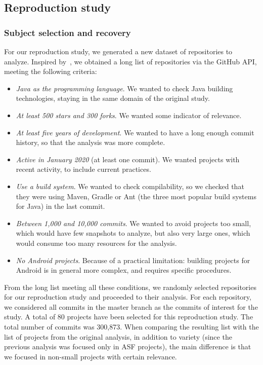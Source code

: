 \subsection{Reproduction study}

\subsubsection{Subject selection and recovery}

For our reproduction study, we generated a new dataset of repositories to analyze. Inspired by~\cite{Sulir:2016:QSJ:3001878.3001882}, we obtained a long list of repositories via the GitHub API, meeting the following criteria:

\begin{itemize}
\item \textit{Java as the programming language}. We wanted to check Java building technologies, staying in the same domain of the original study.
\item \textit{At least 500 stars and 300 forks}. We wanted some indicator of relevance.
\item \textit{At least five years of development}. We wanted to have a long enough commit history, so that the analysis was more complete.
\item \textit{Active in January 2020} (at least one commit). We wanted projects with recent activity, to include current practices.
\item \textit{Use a build system}. We wanted to check compilability, so we checked that they were using Maven, Gradle or Ant (the three most popular build systems for Java) in the last commit.
\item \textit{Between 1,000 and 10,000 commits}. We wanted to avoid projects too small, which would have few snapshots to analyze, but also very large ones, which would consume too many resources for the analysis.
\item \textit{No Android projects}. Because of a practical limitation: building projects for Android is in general more complex, and requires specific procedures.
\end{itemize}

From the long list meeting all these conditions, we randomly selected repositories for our reproduction study and proceeded to their analysis.
For each repository, we considered all commits in the master branch as the commits of interest for the study. 
A total of 80 projects have been selected for this reproduction study.
The total number of commits was 300,873.
When comparing the resulting list with the list of projects from the original analysis, in addition to variety (since the previous analysis was focused only in ASF projects), the main difference is that we focused in non-small projects with certain relevance.


